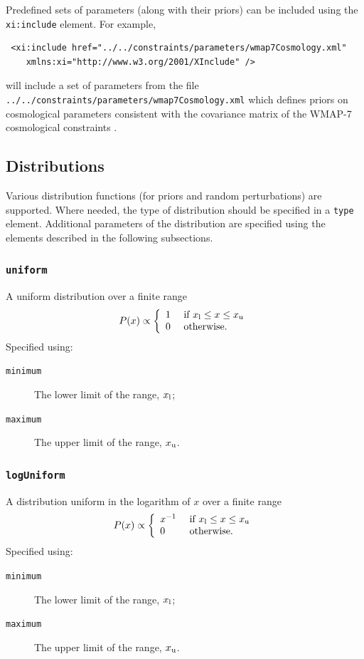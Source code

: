 Predefined sets of parameters (along with their priors) can be included using the {\tt xi:include} element. For example,
\begin{verbatim}
 <xi:include href="../../constraints/parameters/wmap7Cosmology.xml"
    xmlns:xi="http://www.w3.org/2001/XInclude" />
\end{verbatim}
will include a set of parameters from the file {\tt ../../constraints/parameters/wmap7Cosmology.xml} which defines priors on cosmological parameters consistent with the covariance matrix of the WMAP-7 cosmological constraints \citep{komatsu_seven-year_2010}.

\subsection{Distributions}

Various distribution functions (for priors and random perturbations) are supported. Where needed, the type of distribution should be specified in a {\tt type} element. Additional parameters of the distribution are specified using the elements described in the following subsections.

\subsubsection{{\tt uniform}}

A uniform distribution over a finite range
\begin{equation}
P(x) \propto \left\{ \begin{array}{ll} 1 & \hbox{ if } x_{\rm l} \leq x \leq x_{\rm u} \\ 0 & \hbox{ otherwise.}  \end{array} \right.
\end{equation}
Specified using:
\begin{description}
\item[{\tt minimum}] The lower limit of the range, $x_{\rm l}$;
\item[{\tt maximum}] The upper limit of the range, $x_{\rm u}$.
\end{description}

\subsubsection{{\tt logUniform}}

A distribution uniform in the logarithm of $x$ over a finite range
\begin{equation}
P(x) \propto \left\{ \begin{array}{ll} x^{-1} & \hbox{ if } x_{\rm l} \leq x \leq x_{\rm u} \\ 0 & \hbox{ otherwise.}  \end{array} \right.
\end{equation}
Specified using:
\begin{description}
\item[{\tt minimum}] The lower limit of the range, $x_{\rm l}$;
\item[{\tt maximum}] The upper limit of the range, $x_{\rm u}$.
\end{description}

